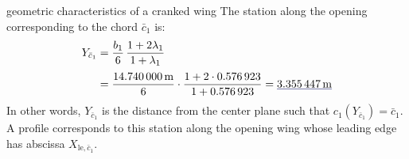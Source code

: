 \documentclass[[12pt,twoside]{book}
\begin{document}
\begin{myExampleX}{geometric characteristics of a cranked wing}{}
The station along the opening corresponding to the chord $\bar{c}_1$ is:
\[
\begin{split}
Y_{\bar{c}_1} 
  & {}=
    \frac{b_1}{6} \, \frac{1+2\lambda_1}{1+\lambda_1} \\[3pt]
  & {}=
    \frac{\SI[round-precision=1]{\mySpanWingIMT}{\metre}}{6}
      \cdot 
      \frac{
        1 + 2\cdot\SI[round-precision=2]{\myTaperRatioWingI}{}
      }{
        1 + \SI[round-precision=2]{\myTaperRatioWingI}{}
      }
    = \mathunderline{mydarkblue}{ \SI[round-precision=2]{\myYMACWingIMT}{\metre} }
\end{split}
\]
In other words, $Y_{\bar{c}_1}$ is the distance from the center plane such that
$c_1(Y_{\bar{c}_1})=\bar{c}_1$. A profile corresponds to this station along the opening
wing whose leading edge has abscissa $X_{\mathrm{le},\bar{c}_1}$.



\end{myExampleX}
\end{document}
